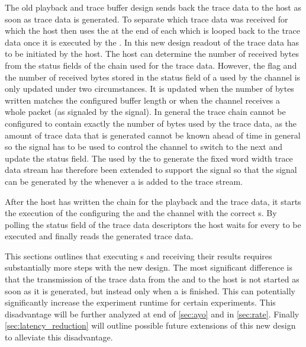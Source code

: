 The old playback and trace buffer design sends back the trace data to the host as soon as trace data is generated. To separate which trace data was received for which \PlaybackProgram{} the host then uses the \haltInstr{} at the end of each \PlaybackProgram{} which is looped back to the trace data once it is executed by the \pbexec{}.
In this new design readout of the trace data has to be initiated by the host. The host can determine the number of received bytes from the status fields of the \descriptor{} chain used for the trace data.
However, the \completed{} flag and the number of received bytes stored in the status field of a \descriptor{} used by the \SToMM{} channel is only updated under two circumstances. It is updated when the number of bytes written matches the configured buffer length or when the \SToMM{} channel receives a whole packet (as signaled by the \TLAST{} signal). In general the trace \descriptor{} chain cannot be configured to contain exactly the number of bytes used by the trace data, as the amount of trace data that is generated cannot be known ahead of time in general so the \TLAST{} signal has to be used to control the \SToMM{} channel to switch to the next \descriptor{} and update the status field.
The \UTEncoder{} used by the \pbexec{} to generate the fixed word width trace data stream has therefore been extended to support the \TLAST{} signal so that the \TLAST{} signal can be generated by the \pbexec{} whenever a \haltInstr{} is added to the trace stream.

After the host has written the \descriptor{} chain for the playback and the trace data, it starts the execution of the \PlaybackProgram{} configuring the \SToMM{} and the \MMToS{} channel with the correct \descriptor{}s.
By polling the status field of the trace data descriptors the host waits for every \PlaybackProgram{} to be executed and finally reads the generated trace data.

This sections outlines that executing \PlaybackProgram{}s and receiving their results requires substantially more steps with the new design. The most significant difference is that the transmission of the trace data from the \FPGA{} and to the host is not started as soon as it is generated, but instead only when a \PlaybackProgram{} is finished. This can potentially significantly increase the experiment runtime for certain experiments. This disadvantage will be further analyzed at end of \autoref{sec:ayo} and in \autoref{sec:rate}. Finally \autoref{sec:latency_reduction} will outline possible future extensions of this new design to alleviate this disadvantage.

